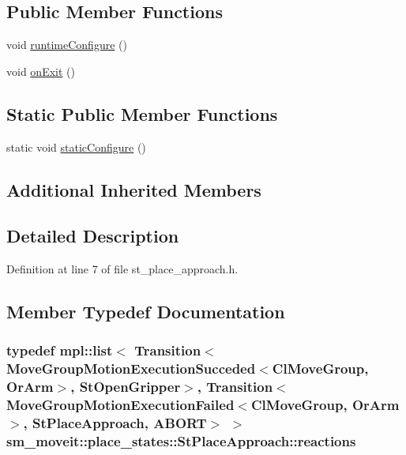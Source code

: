 \subsection*{Public Member Functions}
\begin{DoxyCompactItemize}
\item 
void \hyperlink{structsm__moveit_1_1place__states_1_1StPlaceApproach_a287b39f8eb6a5aca4f0b1e63cb275f7a}{runtime\+Configure} ()
\item 
void \hyperlink{structsm__moveit_1_1place__states_1_1StPlaceApproach_a4088322d84e4da8ce35253d2854a3710}{on\+Exit} ()
\end{DoxyCompactItemize}
\subsection*{Static Public Member Functions}
\begin{DoxyCompactItemize}
\item 
static void \hyperlink{structsm__moveit_1_1place__states_1_1StPlaceApproach_a18cfb69a3268faad24cd10e4d1ff8877}{static\+Configure} ()
\end{DoxyCompactItemize}
\subsection*{Additional Inherited Members}


\subsection{Detailed Description}


Definition at line 7 of file st\+\_\+place\+\_\+approach.\+h.



\subsection{Member Typedef Documentation}
\subsubsection[{\texorpdfstring{reactions}{reactions}}]{\setlength{\rightskip}{0pt plus 5cm}typedef mpl\+::list$<$ Transition$<${\bf Move\+Group\+Motion\+Execution\+Succeded}$<${\bf Cl\+Move\+Group}, {\bf Or\+Arm}$>$, {\bf St\+Open\+Gripper}$>$, Transition$<${\bf Move\+Group\+Motion\+Execution\+Failed}$<${\bf Cl\+Move\+Group}, {\bf Or\+Arm}$>$, {\bf St\+Place\+Approach}, {\bf A\+B\+O\+RT}$>$ $>$ {\bf sm\+\_\+moveit\+::place\+\_\+states\+::\+St\+Place\+Approach\+::reactions}}\hypertarget{structsm__moveit_1_1place__states_1_1StPlaceApproach_a8532a592c622e84d25b282e727c1f475}{}\label{structsm__moveit_1_1place__states_1_1StPlaceApproach_a8532a592c622e84d25b282e727c1f475}


